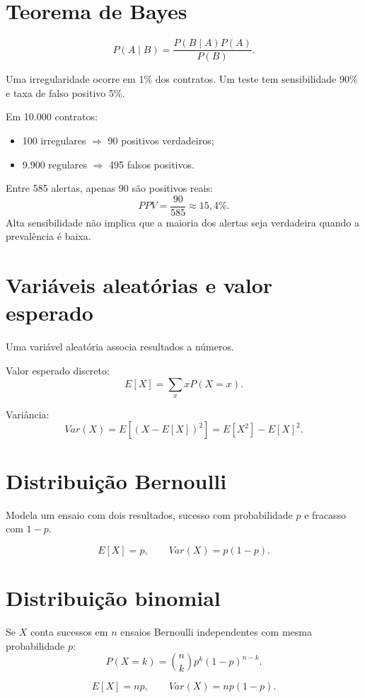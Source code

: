\section{Teorema de Bayes}

\[
P(A\mid B)=\frac{P(B\mid A)P(A)}{P(B)}.
\]

\begin{exemplo}
Uma irregularidade ocorre em 1\% dos contratos. Um teste tem sensibilidade 90\% e taxa de falso positivo 5\%.

Em 10.000 contratos:
\begin{itemize}
\item 100 irregulares $\Rightarrow$ 90 positivos verdadeiros;
\item 9.900 regulares $\Rightarrow$ 495 falsos positivos.
\end{itemize}

Entre 585 alertas, apenas 90 são positivos reais:
\[
PPV=\frac{90}{585}\approx15{,}4\%.
\]
Alta sensibilidade não implica que a maioria dos alertas seja verdadeira quando a prevalência é baixa.
\end{exemplo}

\section{Variáveis aleatórias e valor esperado}

Uma variável aleatória associa resultados a números.

Valor esperado discreto:
\[
E[X]=\sum_x xP(X=x).
\]

Variância:
\[
Var(X)=E[(X-E[X])^2]=E[X^2]-E[X]^2.
\]

\section{Distribuição Bernoulli}

Modela um ensaio com dois resultados, sucesso com probabilidade $p$ e fracasso com $1-p$.

\[
E[X]=p,\qquad Var(X)=p(1-p).
\]

\section{Distribuição binomial}

Se $X$ conta sucessos em $n$ ensaios Bernoulli independentes com mesma probabilidade $p$:
\[
P(X=k)=\binom{n}{k}p^k(1-p)^{n-k}.
\]

\[
E[X]=np,\qquad Var(X)=np(1-p).
\]

